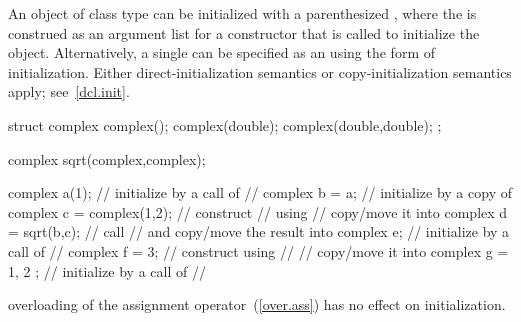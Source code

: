 \pnum
An object of class type can be initialized with a parenthesized
,
where the
is construed as an argument list for a constructor
that is called to initialize the object.
Alternatively, a single
can be specified as an
using the
\tcode{=}
form of initialization.
Either direct-initialization semantics or copy-initialization semantics apply;
see~\ref{dcl.init}.
%
\begin{example}

\begin{codeblock}
struct complex {
  complex();
  complex(double);
  complex(double,double);
};

complex sqrt(complex,complex);

complex a(1);                   // initialize by a call of
                                // 
complex b = a;                  // initialize by a copy of 
complex c = complex(1,2);       // construct 
                                // using 
                                // copy/move it into 
complex d = sqrt(b,c);          // call 
                                // and copy/move the result into 
complex e;                      // initialize by a call of
                                // 
complex f = 3;                  // construct  using
                                // 
                                // copy/move it into 
complex g = { 1, 2 };           // initialize by a call of
                                // 
\end{codeblock}
\end{example}
\begin{note}
%
overloading of the assignment operator~(\ref{over.ass})
has no effect on initialization.
\end{note}

